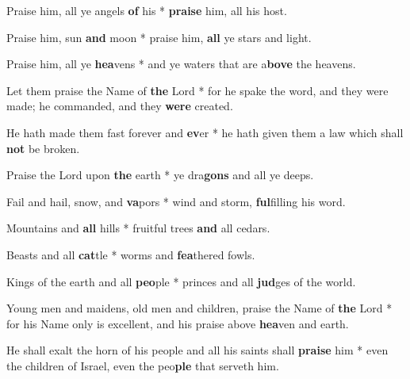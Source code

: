 \begin{multicols}{2}
	Praise him, all ye angels \textbf{of} his * \textbf{praise} him, all his host.
	
	Praise him, sun \textbf{and} moon * praise him, \textbf{all} ye stars and light.
	
	Praise him, all ye \textbf{hea}vens * and ye waters that are a\textbf{bove} the heavens.
	
	Let them praise the Name of \textbf{the} Lord * for he spake the word, and they were made; he commanded, and they \textbf{were} created.
	
	He hath made them fast forever and \textbf{ev}er * he hath given them a law which shall \textbf{not} be broken.
	
	Praise the Lord upon \textbf{the} earth * ye dra\textbf{gons} and all ye deeps.
	
	Fail and hail, snow, and \textbf{va}pors * wind and storm, \textbf{ful}filling his word.
	
	Mountains and \textbf{all} hills * fruitful trees \textbf{and} all cedars.
	
	Beasts and all \textbf{cat}tle * worms and \textbf{fea}thered fowls.
	
	Kings of the earth and all \textbf{peo}ple * princes and all \textbf{jud}ges of the world.
	
	Young men and maidens, old men and children, praise the Name of \textbf{the} Lord * for his Name only is excellent, and his praise above \textbf{hea}ven and earth.
	
	He shall exalt the horn of his people and all his saints shall \textbf{praise} him * even the children of Israel, even the peo\textbf{ple} that serveth him.
\end{multicols}